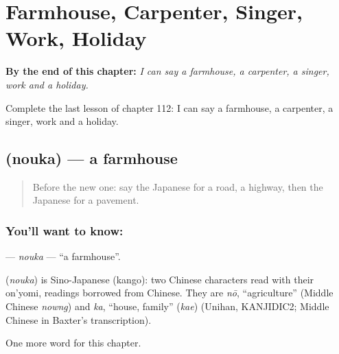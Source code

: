 
\chapter{Farmhouse, Carpenter, Singer, Work, Holiday}
\label{ch:ja-farmhouse-carpenter-singer-work-holiday}

\begin{chapteropening}
\textbf{By the end of this chapter:} \emph{I can say a farmhouse, a carpenter, a singer, work and a holiday.}

Complete the last lesson of chapter 112: I can say a farmhouse, a carpenter, a singer, work and a holiday.
\end{chapteropening}

\section[\texorpdfstring{\ja{のうか} (nouka)}{のうか (nouka)}]{ (nouka) — a farmhouse}

\label{lesson:JA-C112-nouka}



\begin{quote}
Before the new one: say the Japanese for a road, a highway, then the Japanese for a pavement.
\end{quote}

\subsection*{You'll want to know: }
\textbf{} — \emph{nouka} — \textquotedblleft{}a farmhouse\textquotedblright{}.

\begin{cousinweb}
\textbf{} (\emph{nouka}) is Sino-Japanese (kango): two Chinese characters read with their on'yomi, readings borrowed from Chinese. They are \emph{nō}, \textquotedblleft{}agriculture\textquotedblright{} (Middle Chinese \emph{nowng}) and \emph{ka}, \textquotedblleft{}house, family\textquotedblright{} (\emph{kae}) (Unihan, KANJIDIC2; Middle Chinese in Baxter's transcription).
\end{cousinweb}

\begin{grammarlens}[title={What you've built}]
One more word for this chapter.
\end{grammarlens}

